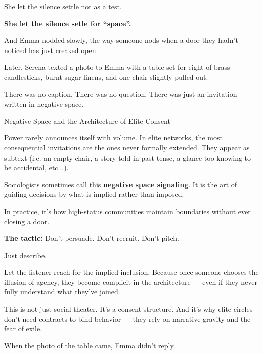 She let the silence settle not as a test. 

\textbf{She let the silence setle for ``space''.} 

And Emma nodded slowly, the way someone nods when a door they hadn’t noticed has just creaked open.

Later, Serena texted a photo to Emma with a table set for eight of 
brass candlesticks, burnt sugar linens, and one chair slightly pulled out.

There was no caption.  
There was no question.  
There was just an invitation written in negative space.

\medskip

\begin{PsychologicalSidebar}{Negative Space and the Architecture of Elite Consent}

Power rarely announces itself with volume.  
In elite networks, the most consequential invitations are the ones never formally extended.  
They appear as subtext (i.e. an empty chair, a story told in past tense, a glance too knowing 
to be accidental, etc...).

\medskip

Sociologists sometimes call this \textbf{negative space signaling}. It is the art of guiding 
decisions by what is implied rather than imposed.  

\medskip

In practice, it's how high-status communities maintain boundaries without ever closing a door.  

\medskip

\textbf{The tactic:}  Don’t persuade. Don’t recruit. Don’t pitch.

\medskip

Just describe.

\medskip

Let the listener reach for the implied inclusion.  
Because once someone chooses the illusion of agency, they become complicit in the architecture — even if 
they never fully understand what they’ve joined.

\medskip

This is not just social theater.  
It’s a consent structure.  
And it’s why elite circles don’t need contracts to bind behavior — they rely on narrative gravity and the fear of exile.

\end{PsychologicalSidebar}

\medskip

When the photo of the table came, Emma didn’t reply.

